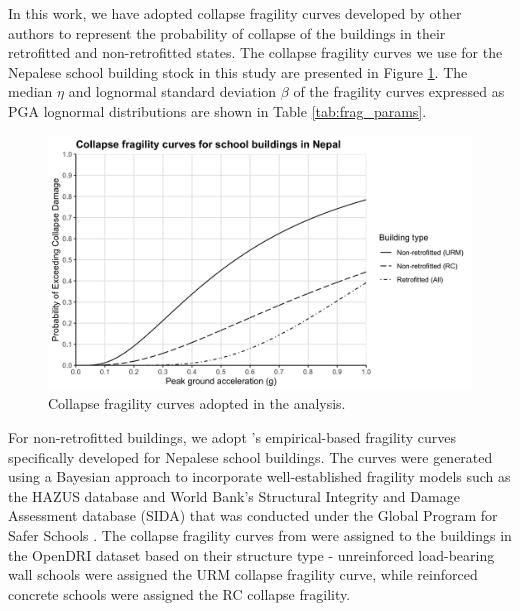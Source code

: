 In this work, we have adopted collapse fragility curves developed by other authors to represent the probability of collapse of the buildings in their retrofitted and non-retrofitted states. The collapse fragility curves we use for the Nepalese school building stock in this study are presented in Figure \ref{fig:frag_curves}. The median $\eta$ and lognormal standard deviation $\beta$ of the fragility curves expressed as PGA lognormal distributions are shown in Table \ref{tab:frag_params}.

\begin{figure}[h!]
\begin{center}
    \includegraphics[width=\linewidth]{Figures/data-fragility-v4.png}
    \caption{Collapse fragility curves adopted in the analysis.}
    \label{fig:frag_curves}
\end{center}
\end{figure}

For non-retrofitted buildings, we adopt \cite{giordano2021empirical}'s empirical-based fragility curves specifically developed for Nepalese school buildings. The curves were generated using a Bayesian approach to incorporate well-established fragility models such as the HAZUS database \citep{mh20152} and World Bank's Structural Integrity and Damage Assessment database (SIDA) that was conducted under the Global Program for Safer Schools \citep{wbglosi}. The collapse fragility curves from \cite{giordano2021empirical} were assigned to the buildings in the OpenDRI dataset based on their structure type - unreinforced load-bearing wall schools were assigned the URM collapse fragility curve, while reinforced concrete schools were assigned the RC collapse fragility.



